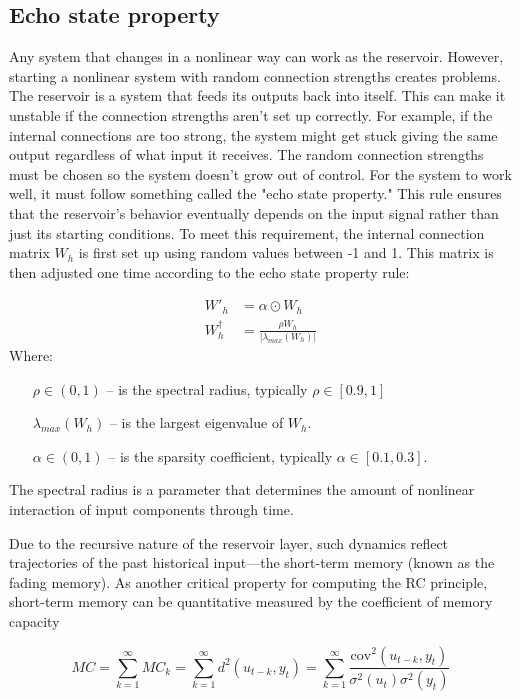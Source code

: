 \documentclass[11pt, oneside]{article}
\begin{document}
\subsection{Echo state property}

Any system that changes in a nonlinear way can work as the reservoir. However, starting a nonlinear system with random connection strengths creates problems.
The reservoir is a system that feeds its outputs back into itself. This can make it unstable if the connection strengths aren't set up correctly. For example, if the internal connections are too strong, the system might get stuck giving the same output regardless of what input it receives. The random connection strengths must be chosen so the system doesn't grow out of control.
For the system to work well, it must follow something called the "echo state property." This rule ensures that the reservoir's behavior eventually depends on the input signal rather than just its starting conditions.
To meet this requirement, the internal connection matrix $W_h$ is first set up using random values between -1 and 1. This matrix is then adjusted one time according to the echo state property rule:

\begin{align}
    W'_h &= \alpha \odot {W_h} \\
    W_h^{\dagger} &= \frac{\rho  W_h}{\left\lvert \lambda_{max}(W_h) \right\rvert }
\end{align}
Where:
\begin{itemize}[noitemsep, leftmargin=4cm, label={}]
    \item [$\rho \in (0,1)$] -- is the spectral radius, typically $\rho \in [0.9, 1]$
    \item [$\lambda_{max}(W_h)$] -- is the largest eigenvalue of $W_h $.
    \item[$\alpha \in (0,1)$] -- is the sparsity coefficient, typically $\alpha \in [0.1, 0.3]$.
\end{itemize}
The spectral radius is a parameter that determines the amount of nonlinear interaction of input components through time.

Due to the recursive nature of the reservoir layer,
such dynamics reflect trajectories of the past historical input—the short-term memory (known as the fading memory). As another critical property for computing the RC principle, short-term memory can be
quantitative measured by the coefficient of memory
capacity


\begin{equation}
    MC = \sum_{k=1}^{\infty} MC_k =
    \sum_{k=1}^{\infty} d^2(u_{t-k}, y_t) =  \sum_{k=1}^{\infty} \frac{\mathrm{cov}^2(u_{t-k}, y_t)}{\sigma^2(u_t) \sigma^2(y_t)}
\end{equation}
\end{document}
